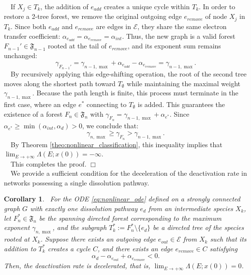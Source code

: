 \documentclass[11pt,a4paper]{article}
\newtheorem{coll}{Corollary}[section]
\begin{document}
\noindent
~~If $X_j \in T_k$, the addition of $e_{add}$ creates a unique cycle within $T_k$. In order to restore a 2-tree forest, we remove the original outgoing edge $e_{remove}$ of node $X_j$ in $T_k$. Since both $e_{add}$ and $e_{remove}$ are edges in $\mathcal{E}$, they share the same electron transfer coefficient: $\alpha_{e_{add}} = \alpha_{e_{remove}} = \alpha_{int}$. Thus, the new graph is a valid forest $F_{n-1}' \in \mathfrak{F}_{n-1}$ rooted at the tail of $e_{remove}$, and its exponent sum remains unchanged:
\begin{equation}
\gamma_{F_{n-1}'} = \gamma_{n-1, \max} + \alpha_{e_{add}} - \alpha_{e_{remove}} = \gamma_{n-1, \max}.
\end{equation}
~~By recursively applying this edge-shifting operation, the root of the second tree moves along the shortest path toward $T_\emptyset$ while maintaining the maximal weight $\gamma_{n-1, \max}$. Because the path length is finite, this process must terminate in the first case, where an edge $e^*$ connecting to $T_\emptyset$ is added. This guarantees the existence of a forest $F_n \in \mathfrak{F}_n$ with $\gamma_{F_n} = \gamma_{n-1, \max} + \alpha_{e^*}$. Since $\alpha_{e^*} \ge \min(\alpha_{int}, \alpha_d) > 0$, we conclude that:
\begin{equation}
\gamma_{n, \max} \ge \gamma_{F_n} > \gamma_{n-1, \max}.
\end{equation}
~~By Theorem \ref{theo:nonlinear_classification}, this inequality implies that $\lim_{E \to +\infty}\Lambda(E;x(0)) = -\infty$.\\
~~This completes the proof. \hfill $\Box$ \\[0.2cm]
~~We provide a sufficient condition for the deceleration of the deactivation rate in networks possessing a single dissolution pathway.
\begin{coll}~For the ODE \eqref{eq:nonlinear_ode} defined on a strongly connected graph $G$ with exactly one dissolution pathway $e_d$ from an intermediate species $X_k$, let $F_n^* \in \mathfrak{F}_n$ be the spanning directed forest corresponding to the maximum exponent $\gamma_{n, \max}$, and the subgraph $T_k^* := F_n^* \setminus \{e_d\}$ be a directed tree of the species rooted at $X_k$. Suppose there exists an outgoing edge $e_{out} \in {\mathcal E}$ from $X_k$ such that its addition to $T_k^*$ creates a cycle $C$, and there exists an edge $e_{remove} \in C$ satisfying
\begin{equation}
\alpha_d - \alpha_{e_{out}} + \alpha_{e_{remove}} < 0.
\end{equation}
Then, the deactivation rate is decelerated, that is, $\lim_{E \to +\infty}\Lambda(E;x(0)) = 0$.
\end{coll}
\end{document}
